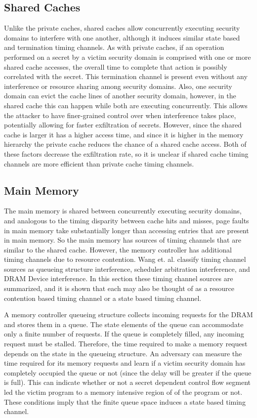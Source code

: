 \subsection{Shared Caches}
Unlike the private caches, shared caches allow concurrently executing security 
domains to interfere with one another, although it induces similar state based 
and termination timing channels. As with private caches, if an operation 
performed on a secret by a victim security domain is  comprised with one or 
more shared cache accesses, the overall time to complete that action is 
possibly correlated with the secret. This termination channel is present even 
without any interference or resource sharing among security domains.
Also, one security domain can evict the cache lines of another security domain, 
however, in the shared cache this can happen while both are executing 
concurrently. This allows the attacker to have finer-grained control over when 
interference takes place, potentially allowing for faster exfiltration of 
secrets. However, since the shared cache is larger it has a higher access time, 
and since it is higher in the memory hierarchy the private cache reduces the 
chance of a shared cache access. Both of these factors decrease the 
exfiltration rate, so it is unclear if shared cache timing channels are more 
efficient than private cache timing channels.

\subsection{Main Memory}
The main memory is shared between concurrently executing security domains, and 
analogous to the timing disparity between cache hits and misses, page faults in 
main memory take substantially longer than accessing entries that are present 
in main memory. So the main memory has sources of timing channels that are 
similar to the shared cache. However, the memory controller has additional 
timing channels due to resource contention. Wang et. al. classify timing 
channel sources as queueing structure interference, scheduler arbitration 
interference, and DRAM Device interference. In this section these timing 
channel sources are summarized, and it is shown that each may also be thought
of as a resource contention based timing channel or a state based timing 
channel.

A memory controller queueing structure collects incoming requests for the DRAM 
and stores them in a queue. The state elements of the queue can accommodate 
only a finite number of requests. If the queue is completely filled, any 
incoming request must be stalled. Therefore, the time required to make a memory 
request depends on the state in the queueing structure. An adversary can 
measure the time required for its memory requests and learn if a victim 
security domain has completely occupied the queue or not (since the delay will 
be greater if the queue is full). This can indicate whether or not a secret 
dependent control flow segment led the victim program to a memory intensive 
region of of the program or not. These conditions imply that the finite queue 
space induces a state based timing channel.

